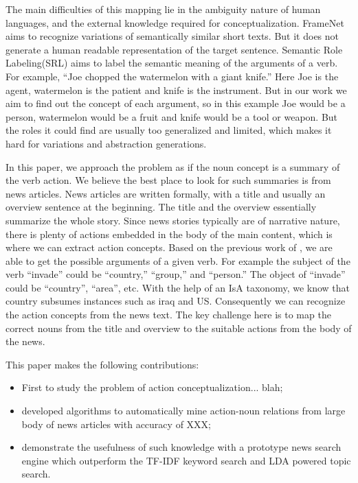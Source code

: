 The main difficulties of this mapping lie in the ambiguity nature of human
languages, and the external knowledge required for conceptualization. FrameNet \cite{baker1998berkeley}
aims to recognize variations of semantically similar short texts. But it does not generate
a human readable representation of the target sentence. Semantic Role Labeling(SRL)
\cite{palmer2005proposition}aims to label the semantic meaning of the arguments of a verb.
For example, ``Joe chopped the watermelon with
a giant knife.'' Here Joe is the agent, watermelon is the patient and knife is the instrument.
But in our work we aim to find out the concept of each argument, so in this example
Joe would be a person, watermelon would be a fruit and knife would be a tool or weapon.
But the roles it could find are usually too generalized and limited, which makes it hard
for variations and abstraction generations.

In this paper, we approach the problem as if the noun concept is a
summary of the verb action. We believe the best place to look for
such summaries is from news articles. News articles are written
formally, with a title and usually an overview sentence at the
beginning. The title and the overview essentially summarize the whole
story. Since news stories typically are of narrative nature, there is
plenty of actions embedded in the body of the main content, which is
where we can extract action concepts.
Based on the previous work of \cite{gong2015representing},
we are able to get the possible arguments of a given verb.
For example the subject of the verb ``invade'' could
be ``country,'' ``group,'' and ``person.''
The object of ``invade'' could be ``country'', ``area'', etc.
With the help of an IsA taxonomy, we know that country subsumes
instances such as iraq and US. Consequently
we can recognize the action concepts from the news text.
The key challenge here is
to map the correct nouns from the title and overview to the suitable
actions from the body of the news.

This paper makes the following contributions:
\begin{itemize}
\item First to study the problem of action conceptualization... blah;
\item developed algorithms to automatically mine action-noun relations from
large body of news articles with accuracy of XXX;
\item demonstrate the usefulness of such knowledge with a prototype
news search engine which outperform the TF-IDF keyword search and
LDA powered topic search.
\end{itemize}
